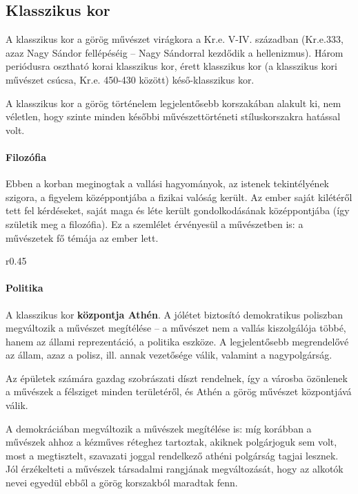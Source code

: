 \newpage


\subsection*{Klasszikus kor}

A klasszikus kor a görög művészet virágkora a Kr.e. V-IV. században (Kr.e.333, azaz Nagy Sándor fellépéséig – Nagy Sándorral kezdődik a hellenizmus). Három periódusra osztható korai klasszikus kor, érett klasszikus kor (a klasszikus kori művészet csúcsa, Kr.e. 450-430 között) késő-klasszikus kor.

A klasszikus kor a görög történelem legjelentősebb korszakában alakult ki, nem véletlen, hogy szinte minden későbbi művészettörténeti stíluskorszakra hatással volt.

\paragraph{Filozófia} Ebben a korban meginogtak a vallási hagyományok, az istenek tekintélyének szigora, a figyelem középpontjába a fizikai valóság került. Az ember saját kilétéről tett fel kérdéseket, saját maga és léte került gondolkodásának középpontjába (így születik meg a filozófia). Ez a szemlélet érvényesül a művészetben is: a művészetek fő témája az ember lett.

\begin{wrapfigure}{r}{0.45\textwidth}
\end{wrapfigure}

\paragraph{Politika} 
A klasszikus kor \textbf{központja Athén}. A jólétet biztosító demokratikus poliszban megváltozik a művészet megítélése – a művészet nem a vallás kiszolgálója többé, hanem az állami reprezentáció, a politika eszköze. A legjelentősebb megrendelővé az állam, azaz a polisz, ill. annak vezetősége válik, valamint a nagypolgárság.

Az épületek számára gazdag szobrászati díszt rendelnek, így a városba özönlenek a művészek a félsziget minden területéről, és Athén a görög művészet központjává válik.

A demokráciában megváltozik a művészek megítélése is: míg korábban a művészek ahhoz a kézműves réteghez tartoztak, akiknek polgárjoguk sem volt, most a megtisztelt, szavazati joggal rendelkező athéni polgárság tagjai lesznek. Jól érzékelteti a művészek társadalmi rangjának megváltozását, hogy az alkotók nevei egyedül ebből a görög korszakból maradtak fenn.

